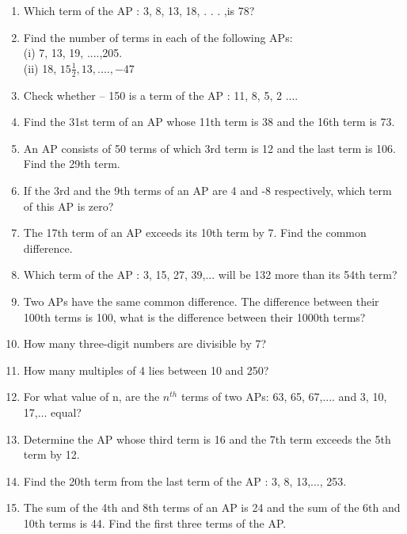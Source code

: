 \begin{enumerate}[label=\arabic*.,ref=\thesubsection.\theenumi]
\begin{enumerate}
\item $-48\frac{1}{2}$
\end{enumerate}
(iii) In the following APs, find the missing terms in the blanks  :
\begin{enumerate}
\item 2, .... , 26
\item ...., 13. ...., 3
\item 5, ...., ...., 9$\frac{1}{2}$
\item -4, ...., ...., ...., ..., 6
\item ...., 38, ...., ...., ...., -22
\end{enumerate}
\item Which term of the AP : 3, 8, 13, 18, . . . ,is 78?
\item Find the number of terms in each of the following APs:\\
(i) 7, 13, 19, ....,205.\\
(ii) 18, $15\frac{1}{2}, 13,....,-47$
\item Check whether – 150 is a term of the AP : 11, 8, 5, 2 ....
\item Find the 31st term of an AP whose 11th term is 38 and the 16th term is 73.
\item An AP consists of 50 terms of which 3rd term is 12 and the last term is 106. Find the 29th term.
\item If the 3rd and the 9th terms of an AP are 4 and -8 respectively, which term of this AP is zero?
\item The 17th term of an AP exceeds its 10th term by 7. Find the common difference.
\item Which term of the AP : 3, 15, 27, 39,... will be 132 more than its 54th term? 
\item Two APs have the same common difference. The difference between their 100th terms is 100, what is the difference between their 1000th terms?
\item How many three-digit numbers are divisible by 7?
\item How many multiples of 4 lies between 10 and 250?
\item For what value of n, are the $n^{th}$ terms of two APs: 63, 65, 67,.... and 3, 10, 17,... equal?
\item Determine the AP whose third term is 16 and the 7th term exceeds the 5th term by 12.
\item Find the 20th term from the last term of the AP : 3, 8, 13,..., 253.
\item The sum of the 4th and 8th terms of an AP is 24 and the sum of the 6th and 10th terms is 44. Find the first three terms of the AP.

\end{enumerate}
